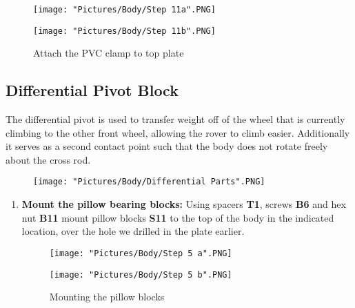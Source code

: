 \documentclass[12pt]{article}
\begin{document}
\begin{enumerate}
\begin{figure}[H]
  \centering
  \begin{minipage}[b]{0.40\textwidth}
    \texttt{[image: "Pictures/Body/Step 11a".PNG]}
  \end{minipage}
  \hfill
  \begin{minipage}[b]{0.50\textwidth}
    \texttt{[image: "Pictures/Body/Step 11b".PNG]}
  \end{minipage}
  \caption{Attach the PVC clamp to top plate}
	\label{pvc to top plate}
\end{figure}

\end{enumerate}


\subsection{Differential Pivot Block}
The differential pivot is used to transfer weight off of the wheel that is currently climbing to the other front wheel, allowing the rover to climb easier. Additionally it serves as a second contact point such that the body does not rotate freely about the cross rod.

\begin{figure}[H]
	\centering
	\texttt{[image: "Pictures/Body/Differential Parts".PNG]}
\end{figure}

\begin{enumerate}
\item \textbf{Mount the pillow bearing blocks:} Using spacers \textbf{T1}, screws \textbf{B6} and hex nut \textbf{B11} mount pillow blocks \textbf{S11} to the top of the body in the indicated location, over the hole we drilled in the plate earlier.

\begin{figure}[H]
  \centering
  \begin{minipage}[b]{0.30\textwidth}
    \texttt{[image: "Pictures/Body/Step 5 a".PNG]}
  \end{minipage}
  \hfill
  \begin{minipage}[b]{0.55\textwidth}
    \texttt{[image: "Pictures/Body/Step 5 b".PNG]}
  \end{minipage}
  \caption{Mounting the pillow blocks}
\end{figure}


\end{enumerate}
\end{document}
